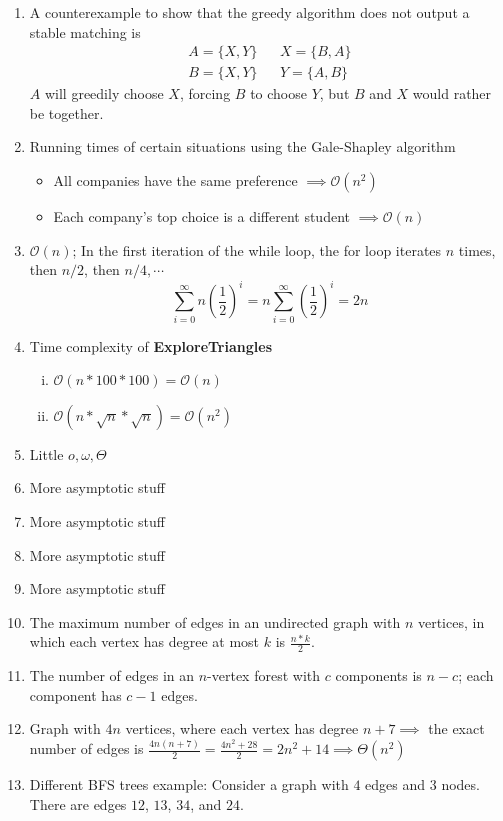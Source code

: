 \documentclass[12pt]{scrartcl}
\begin{document}
\begin{enumerate}
\begin{enumerate}
\item A counterexample to show that the greedy algorithm does not output a stable matching is 
\begin{align*}
  A = \{X, Y\} && X = \{B, A\}\\
  B = \{X, Y\} && Y = \{A, B\}
\end{align*}
$A$ will greedily choose $X$, forcing $B$ to choose $Y$, but $B$ and $X$ 
would rather be together. 
\item Running times of certain situations using the Gale-Shapley algorithm
\begin{itemize}
  \item All companies have the same preference $\implies \mathcal{O}(n^2)$
  \item Each company's top choice is a different student $\implies \mathcal{O}(n)$
\end{itemize}
\item $\mathcal{O}(n)$; In the first iteration of the while loop, the for loop iterates $n$ times, then $n/2$, then $n/4, \cdots$ 
\[\sum_{i=0}^\infty n(\frac{1}{2})^i = n\sum_{i=0}^\infty (\frac{1}{2})^i = 2n\]
\item Time complexity of \textbf{ExploreTriangles}
\begin{enumerate}[i.]
  \item $\mathcal{O}(n * 100 * 100) = \mathcal{O}(n)$
  \item $\mathcal{O}(n * \sqrt{n} * \sqrt{n}) = \mathcal{O}(n^2)$
\end{enumerate}
\item Little $o, \omega, \Theta$ 
\item More asymptotic stuff
\item More asymptotic stuff
\item More asymptotic stuff
\item More asymptotic stuff
\item The maximum number of edges in an undirected graph with $n$ vertices, in which each vertex has degree at most $k$ is $\frac{n * k}{2}$.
\item The number of edges in an $n$-vertex forest with $c$ components is $n - c$; each component has $c-1$ edges.
\item Graph with $4n$ vertices, where each vertex has degree $n + 7 \implies$ the exact number 
of edges is $\frac{4n(n+7)}{2} = \frac{4n^2 + 28}{2} = 2n^2 + 14 \implies \Theta(n^2)$
\item Different BFS trees example: Consider a graph with $4$ edges and $3$ nodes. There are edges $12$, $13$, $34$, and $24$. 

\end{enumerate}
\end{enumerate}
\end{document}
